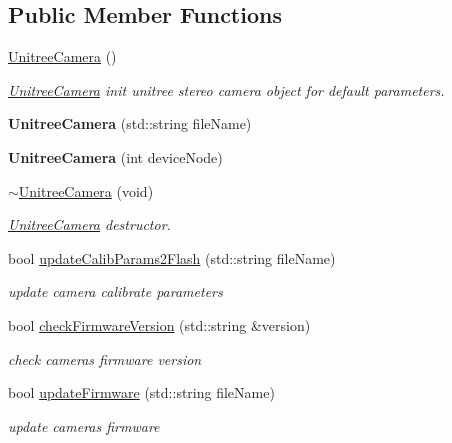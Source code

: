\subsection*{Public Member Functions}
\begin{DoxyCompactItemize}
\item 
\hyperlink{class_unitree_camera_af8a5e0c70f99096ecd378680d2f1ec27}{Unitree\+Camera} ()
\begin{DoxyCompactList}\small\item\em \hyperlink{class_unitree_camera}{Unitree\+Camera} init unitree stereo camera object for default parameters. \end{DoxyCompactList}\item 
\mbox{\label{class_unitree_camera_afe458a0b083d37d8212ddfcbe62cb033}} 
{\bfseries Unitree\+Camera} (std\+::string file\+Name)
\item 
\mbox{\label{class_unitree_camera_a0d447525ea7fbcba9b9f892387fc91ee}} 
{\bfseries Unitree\+Camera} (int device\+Node)
\item 
\hyperlink{class_unitree_camera_aefb112b0fa677221163ddd18ccf08d8c}{$\sim$\+Unitree\+Camera} (void)
\begin{DoxyCompactList}\small\item\em \hyperlink{class_unitree_camera}{Unitree\+Camera} destructor. \end{DoxyCompactList}\item 
bool \hyperlink{class_unitree_camera_ab056c2e429ec5d91b7e838c18cbd0d73}{update\+Calib\+Params2\+Flash} (std\+::string file\+Name)
\begin{DoxyCompactList}\small\item\em update camera calibrate parameters \end{DoxyCompactList}\item 
bool \hyperlink{class_unitree_camera_a45e182540ab4bb59b68fb07c23bdd91f}{check\+Firmware\+Version} (std\+::string \&version)
\begin{DoxyCompactList}\small\item\em check camera\textquotesingle{}s firmware version \end{DoxyCompactList}\item 
bool \hyperlink{class_unitree_camera_abd0fd0e03ac98f90905ea582e4f397a7}{update\+Firmware} (std\+::string file\+Name)
\begin{DoxyCompactList}\small\item\em update camera\textquotesingle{}s firmware \end{DoxyCompactList}\end{DoxyCompactItemize}


